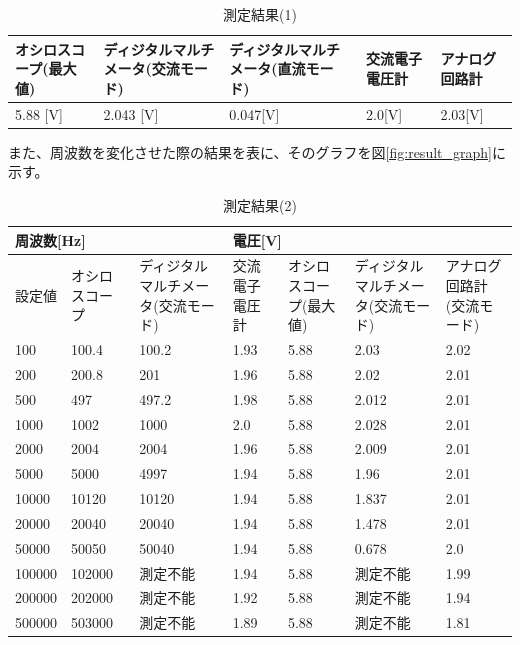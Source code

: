 \documentclass[dvipdfmx]{jsarticle}
\begin{document}
\begin{table}[h]
   \caption{測定結果(1)}
   \label{tb:result1}
   \begin{tabularx}{\linewidth}{|X|X|X|X|X|}\hline
     オシロスコープ(最大値) & ディジタルマルチメータ(交流モード) & ディジタルマルチメータ(直流モード) & 交流電子電圧計 & アナログ回路計\\ \hline
     5.88 [V] & 2.043 [V] & 0.047[V] & 2.0[V] & 2.03[V]\\ \hline
  \end{tabularx}
\end{table}

また、周波数を変化させた際の結果を表に、そのグラフを図\ref{fig:result_graph}に示す。

\begin{table}
  \caption{測定結果(2)}
  \label{tb:result2}
  \begin{tabularx}{\linewidth}{|X|X|X|X|X|X|X|}\hline
      \multicolumn{3}{X}{周波数[Hz]} & \multicolumn{4}{X}{電圧[V]}\\ \hline
      設定値 & オシロスコープ & ディジタルマルチメータ(交流モード) & 交流電子電圧計 & オシロスコープ(最大値) & ディジタルマルチメータ(交流モード) & アナログ回路計(交流モード)\\ \hline
      100 & 100.4 & 100.2 & 1.93 & 5.88 & 2.03 & 2.02 \\ \hline
      200 & 200.8 & 201 & 1.96 & 5.88 & 2.02 & 2.01 \\ \hline
      500 & 497 & 497.2 & 1.98 & 5.88 & 2.012 & 2.01 \\ \hline
      1000 & 1002 & 1000 & 2.0 & 5.88 & 2.028 & 2.01 \\ \hline
      2000 & 2004 & 2004 & 1.96 & 5.88 & 2.009 & 2.01 \\ \hline
      5000 & 5000 & 4997 & 1.94 & 5.88 & 1.96 & 2.01 \\ \hline
      10000 & 10120 & 10120 & 1.94 & 5.88 & 1.837 & 2.01 \\ \hline
      20000 & 20040 & 20040 & 1.94 & 5.88 & 1.478 & 2.01 \\ \hline
      50000 & 50050 & 50040 & 1.94 & 5.88 & 0.678 & 2.0 \\ \hline
      100000 & 102000 & 測定不能 & 1.94 & 5.88 & 測定不能 & 1.99 \\ \hline
      200000 & 202000 & 測定不能 & 1.92 & 5.88 & 測定不能 & 1.94 \\ \hline
      500000 & 503000 & 測定不能 & 1.89 & 5.88 & 測定不能 & 1.81 \\ \hline
  \end{tabularx}
\end{table}
\end{document}

